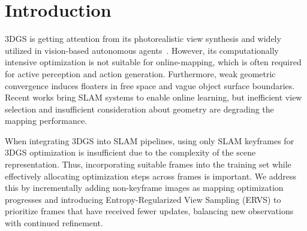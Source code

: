 \documentclass[nth=33]{humantech}
\begin{document}


\section{Introduction}
\label{sec:intro}
\ac{3DGS} is getting attention from its photorealistic view synthesis and widely utilized in vision-based autonomous agents~\cite{intro_zitkovich2023rt2}. However, its computationally intensive optimization is not suitable for online-mapping, which is often required for active perception and action generation. Furthermore, weak geometric convergence induces floaters in free space and vague object surface boundaries. Recent works bring \ac{SLAM} systems to enable online learning, but inefficient view selection and insufficient consideration about geometry are degrading the mapping performance.

When integrating 3DGS into SLAM pipelines, using only SLAM keyframes for 3DGS optimization is insufficient due to the complexity of the scene representation. Thus, incorporating suitable frames into the training set while effectively allocating optimization steps across frames is important. We address this by incrementally adding non-keyframe images as mapping optimization progresses and introducing Entropy-Regularized View Sampling (ERVS) to prioritize frames that have received fewer updates, balancing new observations with continued refinement.
\end{document}
